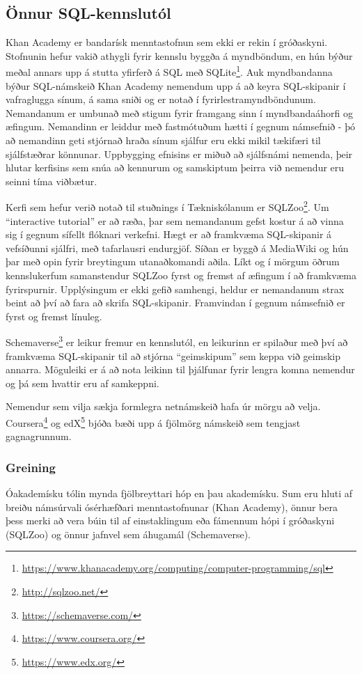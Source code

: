 \documentclass[a4paper,12pt,twoside,BCOR=10mm]{scrbook}
\begin{document}
\subsection{Önnur SQL-kennslutól}
\label{sec:other-sql-teaching-tools}
Khan Academy er bandarísk menntastofnun sem ekki er rekin í gróðaskyni. Stofnunin hefur vakið athygli fyrir kennslu byggða á myndböndum, en hún býður meðal annars upp á stutta yfirferð á SQL með SQLite\footnote{\url{https://www.khanacademy.org/computing/computer-programming/sql}}. Auk myndbandanna býður SQL-námskeið Khan Academy nemendum upp á að keyra SQL-skipanir í vafraglugga sínum, á sama sniði og er notað í fyrirlestramyndböndunum. Nemandanum er umbunað með stigum fyrir framgang sinn í myndbandaáhorfi og æfingum. Nemandinn er leiddur með fastmótuðum hætti í gegnum námsefnið - þó að nemandinn geti stjórnað hraða sínum sjálfur eru ekki mikil tækifæri til sjálfstæðrar könnunar. Uppbygging efnisins er miðuð að sjálfsnámi nemenda, þeir hlutar kerfisins sem snúa að kennurum og samskiptum þeirra við nemendur eru seinni tíma viðbætur.

Kerfi sem hefur verið notað til stuðnings í Tækniskólanum er SQLZoo\footnote{\url{http://sqlzoo.net/}}. Um ``interactive tutorial'' er að ræða, þar sem nemandanum gefst kostur á að vinna sig í gegnum sífellt flóknari verkefni. Hægt er að framkvæma SQL-skipanir á vefsíðunni sjálfri, með tafarlausri endurgjöf. Síðan er byggð á MediaWiki og hún þar með opin fyrir breytingum utanaðkomandi aðila.
Líkt og í mörgum öðrum kennslukerfum samanstendur SQLZoo fyrst og fremst af æfingum í að framkvæma fyrirspurnir. Upplýsingum er ekki gefið samhengi, heldur er nemandanum strax beint að því að fara að skrifa SQL-skipanir. Framvindan í gegnum námsefnið er fyrst og fremst línuleg.

Schemaverse\footnote{\url{https://schemaverse.com/}} er leikur fremur en kennslutól, en leikurinn er spilaður með því að framkvæma SQL-skipanir til að stjórna ``geimskipum'' sem keppa við geimskip annarra. Möguleiki er á að nota leikinn til þjálfunar fyrir lengra komna nemendur og þá sem hvattir eru af samkeppni.

Nemendur sem vilja sækja formlegra netnámskeið hafa úr mörgu að velja. Coursera\footnote{\url{https://www.coursera.org/}} og edX\footnote{\url{https://www.edx.org/}} bjóða bæði upp á fjölmörg námskeið sem tengjast gagnagrunnum.

\subsubsection{Greining}
Óakademísku tólin mynda fjölbreyttari hóp en þau akademísku. Sum eru hluti af breiðu námsúrvali ósérhæfðari menntastofnunar (Khan Academy), önnur bera þess merki að vera búin til af einstaklingum eða fámennum hópi í gróðaskyni (SQLZoo) og önnur jafnvel sem áhugamál (Schemaverse).
\end{document}
